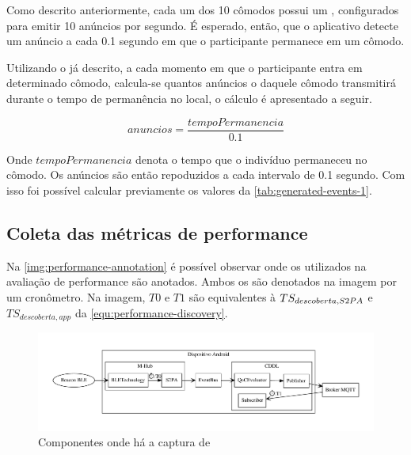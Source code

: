 Como descrito anteriormente, cada um dos 10 cômodos possui um \beacon{} \ble{}, configurados para emitir 10 anúncios por segundo. É esperado, então,  que o aplicativo detecte um anúncio a cada 0.1 segundo em que o participante permanece em um cômodo. 

Utilizando o \dataset{} já descrito, a cada momento em que o participante entra em determinado cômodo, calcula-se quantos anúncios o \beacon{} daquele cômodo transmitirá durante o tempo de permanência no local, o cálculo é apresentado a seguir.

\begin{equation}
	anuncios = \frac{tempoPermanencia}{0.1} 
\end{equation}

Onde $tempoPermanencia$ denota o tempo que o indivíduo permaneceu no cômodo. Os anúncios são então repoduzidos a cada intervalo de 0.1 segundo. Com isso foi possível calcular previamente os valores da \autoref{tab:generated-events-1}.

\subsection{Coleta das métricas de performance}

Na \autoref{img:performance-annotation} é possível observar onde os \timestamps{} utilizados na avaliação de performance são anotados. Ambos os \timestamps{} são denotados na imagem por um cronômetro. Na imagem, $T0$ e $T1$ são equivalentes à $TS_{descoberta,S2PA{}}$ e $TS_{descoberta,app}$ da \autoref{equ:performance-discovery}.

\begin{figure}[htb]
	
	\begin{center}

		\caption{\label{img:performance-annotation}Componentes onde há a captura de \timestamps{}}
		\includegraphics[scale = 0.50]{img/performance-annotation}
		\fonte{\autoriapropria{}}

	\end{center}
	
\end{figure}

